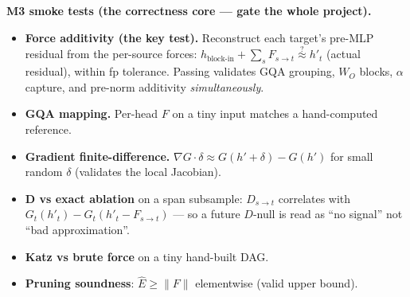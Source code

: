 \documentclass[11pt]{article}
\begin{document}
\textbf{M3 smoke tests (the correctness core --- gate the whole project).}
\begin{itemize}
\item \textbf{Force additivity (the key test).} Reconstruct each target's pre-MLP residual from the
per-source forces: $h_{\text{block-in}} + \sum_s F_{s\to t} \stackrel{?}{\approx} h'_t$ (actual residual),
within fp tolerance. Passing validates GQA grouping, $W_O$ blocks, $\alpha$ capture, and pre-norm
additivity \emph{simultaneously}.
\item \textbf{GQA mapping.} Per-head $F$ on a tiny input matches a hand-computed reference.
\item \textbf{Gradient finite-difference.} $\nabla G\cdot\delta \approx G(h'{+}\delta)-G(h')$ for small
random $\delta$ (validates the local Jacobian).
\item \textbf{D vs exact ablation} on a span subsample: $D_{s\to t}$ correlates with
$G_t(h'_t)-G_t(h'_t-F_{s\to t})$ --- so a future $D$-null is read as ``no signal'' not ``bad
approximation''.
\item \textbf{Katz vs brute force} on a tiny hand-built DAG.
\item \textbf{Pruning soundness}: $\widehat E \ge \lVert F\rVert$ elementwise (valid upper bound).
\end{itemize}
\end{document}
